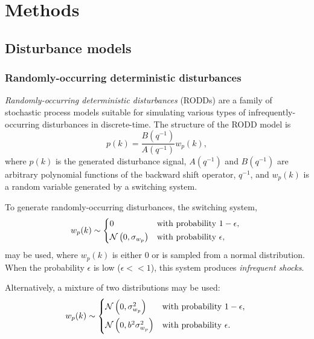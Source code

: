 \chapter{Methods}
\label{chap-methods}

\section{Disturbance models}

\subsection{Randomly-occurring deterministic disturbances}\label{subsec-RODD}

\textit{Randomly-occurring deterministic disturbances} (RODDs) \citep{macgregor_duality_1984} are a family of stochastic process models suitable for simulating various types of infrequently-occurring disturbances in discrete-time.  The structure of the RODD model is
\begin{equation} \label{eq:RODD}
	p(k)= \frac{B(q^{-1})}{A(q^{-1})}w_p(k),
\end{equation}
where $p(k)$ is the generated disturbance signal, $A(q^{-1})$ and $B(q^{-1})$ are arbitrary polynomial functions of the backward shift operator, $q^{-1}$, and $w_p(k)$ is a random variable generated by a switching system.

To generate randomly-occurring disturbances, the switching system,
\begin{equation} \label{eq:alpha1}
w_p(k) \sim 
\begin{cases*}
	0 & with probability $1-\epsilon$, \\
	\mathcal{N}\left(0, \sigma_{w_p}\right) & with probability $\epsilon$,
\end{cases*}
\end{equation}
may be used, where $w_p(k)$ is either 0 or is sampled from a normal distribution.  When the probability $\epsilon$ is low ($\epsilon<<1$), this system produces \textit{infrequent shocks}.

Alternatively, a mixture of two distributions may be used:
\begin{equation} \label{eq:alpha2}
w_p(k) \sim 
	\begin{cases*}
		\mathcal{N}\left(0, \sigma_{w_p}^2\right) & with probability $1-\epsilon$, \\
		\mathcal{N}\left(0, b^2\sigma_{w_p}^2\right) & with probability $\epsilon$.
	\end{cases*}
\end{equation}

